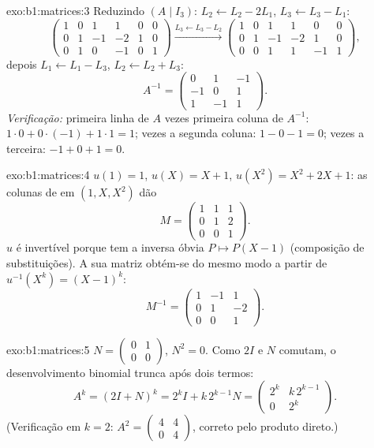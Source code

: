 \begin{solution}{exo:b1:matrices:3}
Reduzindo $(A \mid I_3)$: $L_2 \leftarrow L_2 - 2L_1$, $L_3
\leftarrow L_3 - L_1$:
\[
\begin{pmatrix}
1 & 0 & 1 & 1 & 0 & 0\\
0 & 1 & -1 & -2 & 1 & 0\\
0 & 1 & 0 & -1 & 0 & 1
\end{pmatrix}
\xrightarrow{L_3 \leftarrow L_3 - L_2}
\begin{pmatrix}
1 & 0 & 1 & 1 & 0 & 0\\
0 & 1 & -1 & -2 & 1 & 0\\
0 & 0 & 1 & 1 & -1 & 1
\end{pmatrix},
\]
depois $L_1 \leftarrow L_1 - L_3$, $L_2 \leftarrow L_2 + L_3$:
\[
A^{-1} = \begin{pmatrix}
0 & 1 & -1\\
-1 & 0 & 1\\
1 & -1 & 1
\end{pmatrix}.
\]
\emph{Verificação:} primeira linha de $A$ vezes primeira coluna de
$A^{-1}$: $1
\cdot 0 + 0\cdot(-1) + 1\cdot 1 = 1$; vezes a segunda coluna: $1 - 0 -
1 = 0$; vezes a terceira:
$-1 + 0 + 1 = 0$.
\end{solution}

\begin{solution}{exo:b1:matrices:4}
$u(1) = 1$, $u(X) = X + 1$, $u(X^2) = X^2 + 2X + 1$: as colunas de  em $(1, X, X^2)$ dão
\[
M = \begin{pmatrix}
1 & 1 & 1\\
0 & 1 & 2\\
0 & 0 & 1
\end{pmatrix}.
\]
$u$ é invertível porque tem a inversa óbvia $P \mapsto P(X
- 1)$ (composição de
substituições). A sua matriz obtém-se do mesmo modo a partir de
$u^{-1}(X^k) = (X-1)^k$:
\[
M^{-1} = \begin{pmatrix}
1 & -1 & 1\\
0 & 1 & -2\\
0 & 0 & 1
\end{pmatrix}.
\]
\end{solution}

\begin{solution}{exo:b1:matrices:5}
$N = \begin{pmatrix} 0 & 1\\ 0 & 0\end{pmatrix}$, $N^2 = 0$. Como $2I$ e $N$ comutam, o desenvolvimento
binomial trunca após dois termos:
\[
A^k = (2I + N)^k = 2^k I + k\,2^{k-1} N
= \begin{pmatrix} 2^k & k\,2^{k-1}\\ 0 & 2^k\end{pmatrix}.
\]
(Verificação em $k = 2$: $A^2 = \begin{pmatrix}4 & 4\\ 0 & 4\end{pmatrix}$, correto pelo produto direto.)
\end{solution}


